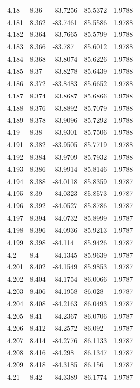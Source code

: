 \begin{tabular}{lllll}
4.18 & 8.36 & -83.7256 & 85.5372 & 1.9788 \\
4.181 & 8.362 & -83.7461 & 85.5586 & 1.9788 \\
4.182 & 8.364 & -83.7665 & 85.5799 & 1.9788 \\
4.183 & 8.366 & -83.787 & 85.6012 & 1.9788 \\
4.184 & 8.368 & -83.8074 & 85.6226 & 1.9788 \\
4.185 & 8.37 & -83.8278 & 85.6439 & 1.9788 \\
4.186 & 8.372 & -83.8483 & 85.6652 & 1.9788 \\
4.187 & 8.374 & -83.8687 & 85.6866 & 1.9788 \\
4.188 & 8.376 & -83.8892 & 85.7079 & 1.9788 \\
4.189 & 8.378 & -83.9096 & 85.7292 & 1.9788 \\
4.19 & 8.38 & -83.9301 & 85.7506 & 1.9788 \\
4.191 & 8.382 & -83.9505 & 85.7719 & 1.9788 \\
4.192 & 8.384 & -83.9709 & 85.7932 & 1.9788 \\
4.193 & 8.386 & -83.9914 & 85.8146 & 1.9788 \\
4.194 & 8.388 & -84.0118 & 85.8359 & 1.9787 \\
4.195 & 8.39 & -84.0323 & 85.8573 & 1.9787 \\
4.196 & 8.392 & -84.0527 & 85.8786 & 1.9787 \\
4.197 & 8.394 & -84.0732 & 85.8999 & 1.9787 \\
4.198 & 8.396 & -84.0936 & 85.9213 & 1.9787 \\
4.199 & 8.398 & -84.114 & 85.9426 & 1.9787 \\
4.2 & 8.4 & -84.1345 & 85.9639 & 1.9787 \\
4.201 & 8.402 & -84.1549 & 85.9853 & 1.9787 \\
4.202 & 8.404 & -84.1754 & 86.0066 & 1.9787 \\
4.203 & 8.406 & -84.1958 & 86.028 & 1.9787 \\
4.204 & 8.408 & -84.2163 & 86.0493 & 1.9787 \\
4.205 & 8.41 & -84.2367 & 86.0706 & 1.9787 \\
4.206 & 8.412 & -84.2572 & 86.092 & 1.9787 \\
4.207 & 8.414 & -84.2776 & 86.1133 & 1.9787 \\
4.208 & 8.416 & -84.298 & 86.1347 & 1.9787 \\
4.209 & 8.418 & -84.3185 & 86.156 & 1.9787 \\
4.21 & 8.42 & -84.3389 & 86.1774 & 1.9787 \\

\end{tabular}
